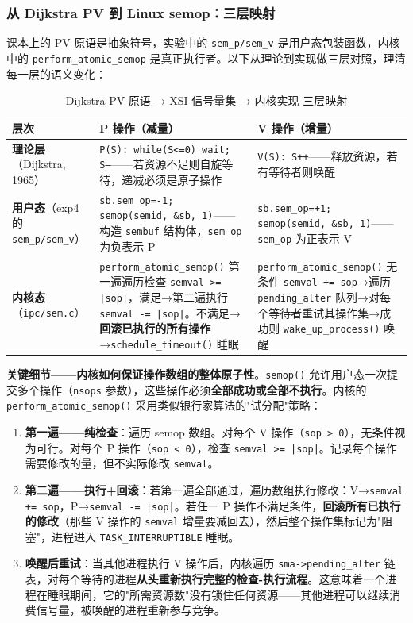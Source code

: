 \documentclass[a4paper]{article}
\begin{document}
\subsubsection{从 Dijkstra PV 到 Linux semop：三层映射}

课本上的 PV 原语是抽象符号，实验中的 \texttt{sem\_p/sem\_v} 是用户态包装函数，内核中的 \texttt{perform\_atomic\_semop} 是真正执行者。以下从理论到实现做三层对照，理清每一层的语义变化：

\begin{table}[htbp]
\centering
\footnotesize
\caption{Dijkstra PV 原语 → XSI 信号量集 → 内核实现 三层映射}
\label{tab:pv_to_xsi}
\begin{tabular}{p{2.5cm}p{4cm}p{5.5cm}}
\toprule
\textbf{层次} & \textbf{P 操作（减量）} & \textbf{V 操作（增量）} \\
\midrule
\textbf{理论层}（Dijkstra, 1965）& \texttt{P(S): while(S<=0) wait; S--}——若资源不足则自旋等待，递减必须是原子操作 & \texttt{V(S): S++}——释放资源，若有等待者则唤醒 \\
\midrule
\textbf{用户态}（exp4 的 \texttt{sem\_p/sem\_v}）& \texttt{sb.sem\_op=-1; semop(semid, \&sb, 1)}——构造 \texttt{sembuf} 结构体，\texttt{sem\_op} 为负表示 P & \texttt{sb.sem\_op=+1; semop(semid, \&sb, 1)}——\texttt{sem\_op} 为正表示 V \\
\midrule
\textbf{内核态}（\texttt{ipc/sem.c}）& \texttt{perform\_atomic\_semop()} 第一遍遍历检查 \texttt{semval >= |sop|}，满足→第二遍执行 \texttt{semval -= |sop|}。不满足→\textbf{回滚已执行的所有操作}→\texttt{schedule\_timeout()} 睡眠 & \texttt{perform\_atomic\_semop()} 无条件 \texttt{semval += sop}→遍历 \texttt{pending\_alter} 队列→对每个等待者重试其操作集→成功则 \texttt{wake\_up\_process()} 唤醒 \\
\bottomrule
\end{tabular}
\end{table}

\textbf{关键细节——内核如何保证操作数组的整体原子性}。\texttt{semop()} 允许用户态一次提交多个操作（\texttt{nsops} 参数），这些操作必须\textbf{全部成功或全部不执行}。内核的 \texttt{perform\_atomic\_semop()} 采用类似银行家算法的"试分配"策略：

\begin{enumerate}[leftmargin=*]
    \item \textbf{第一遍——纯检查}：遍历 semop 数组。对每个 V 操作（\texttt{sop > 0}），无条件视为可行。对每个 P 操作（\texttt{sop < 0}），检查 \texttt{semval >= |sop|}。记录每个操作需要修改的量，但不实际修改 \texttt{semval}。
    \item \textbf{第二遍——执行+回滚}：若第一遍全部通过，遍历数组执行修改：V→\texttt{semval += sop}，P→\texttt{semval -= |sop|}。若任一 P 操作不满足条件，\textbf{回滚所有已执行的修改}（那些 V 操作的 \texttt{semval} 增量要减回去），然后整个操作集标记为"阻塞"，进程进入 \texttt{TASK\_INTERRUPTIBLE} 睡眠。
    \item \textbf{唤醒后重试}：当其他进程执行 V 操作后，内核遍历 \texttt{sma->pending\_alter} 链表，对每个等待的进程\textbf{从头重新执行完整的检查-执行流程}。这意味着一个进程在睡眠期间，它的"所需资源数"没有锁住任何资源——其他进程可以继续消费信号量，被唤醒的进程重新参与竞争。
\end{enumerate}
\end{document}
